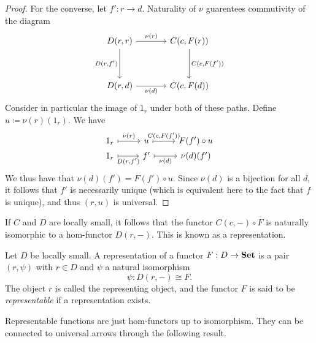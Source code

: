 \begin{proof}
	For the converse, let $f': r \to d$. Naturality of $\nu $ guarentees commutivity of the diagram
	\[\begin{tikzcd}[row sep = 3.5em, column sep = 3.5em]
	D(r,r)\ar[" \nu (r) ", r] \ar[" D(r\text{,} f') "', d]  & C(c,F(r))\ar[" C(c\text{,} F(f')) ", d]  \\
	D(r,d)\ar[" \nu (d) "', r]  & C(c,F(d))
	\end{tikzcd}\]
Consider in particular the image of $1_r$ under both of these paths. Define $u\coloneqq \nu (r)(1_r)$. We have
	\[\begin{tikzcd}[row sep = 0em, column sep = 2.5em]
	1_r\ar[" \nu (r) ", mapsto, r]  & u\ar[" C(c\text{,} F(f'))", r, mapsto]  & F(f')\circ u \\
	1_r\ar[" D(r\text{,} f')"', r, mapsto]  & f'\ar[" \nu (d) "', mapsto, r]  & \nu (d)(f')
	\end{tikzcd}\]
	We thus have that $\nu (d)(f')=F(f')\circ u$. Since $\nu (d)$ is a bijection for all $d$,  it follows that $f'$ is necessarily unique (which is equivalent here to the fact that $f$ is unique), and thus $(r,u)$ is universal.
\end{proof}

If $C$ and $D$ are locally small, it follows that the functor $C(c,-)\circ F$ is naturally isomorphic to a hom-functor $D(r,-)$. This is known as a representation.

\begin{definition}[Representation]\label{dfn:3.3}
	Let $D$ be locally small. A representation of a functor $F:D\to \mathbf{Set} $ is a pair $(r,\psi )$ with $r\in D$ and $\psi $ a natural isomorphism
	\[
		\psi : D(r,-)\cong F
	.\] 
	The object $r$ is called the representing object, and the functor $F$ is said to be \emph{representable} if a representation exists.
\end{definition}

Representable functions are just hom-functors up to isomorphism. They can be connected to universal arrows through the following result.

